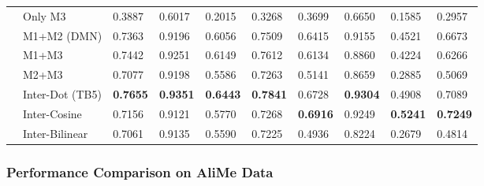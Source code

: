 \begin{table*}[]
\begin{tabular}{l|l|l|l|l|l|l|l|l|l}
		& Only M3         & 0.3887          & 0.6017          & 0.2015          & 0.3268          & 0.3699          & 0.6650          & 0.1585          & 0.2957          \\ \cline{2-10} 
		& M1+M2 (DMN)     & 0.7363          & 0.9196          & 0.6056          & 0.7509          & 0.6415          & 0.9155          & 0.4521          & 0.6673          \\ \cline{2-10} 
		& M1+M3           & 0.7442          & 0.9251          & 0.6149          & 0.7612          & 0.6134          & 0.8860          & 0.4224          & 0.6266          \\ \cline{2-10} 
		& M2+M3           & 0.7077          & 0.9198          & 0.5586          & 0.7263          & 0.5141          & 0.8659          & 0.2885          & 0.5069          \\ \cline{2-10} 
		& Inter-Dot (TB5) & \textbf{0.7655} & \textbf{0.9351} & \textbf{0.6443} & \textbf{0.7841} & 0.6728          & \textbf{0.9304} & 0.4908          & 0.7089          \\ \cline{2-10} 
		& Inter-Cosine    & 0.7156          & 0.9121          & 0.5770          & 0.7268          & \textbf{0.6916} & 0.9249          & \textbf{0.5241} & \textbf{0.7249} \\ \cline{2-10} 
		& Inter-Bilinear  & 0.7061          & 0.9135          & 0.5590          & 0.7225          & 0.4936          & 0.8224          & 0.2679          & 0.4814          \\ \hline \hline
	\end{tabular}
\end{table*}


\subsubsection{\textbf{Performance Comparison on AliMe Data}}

